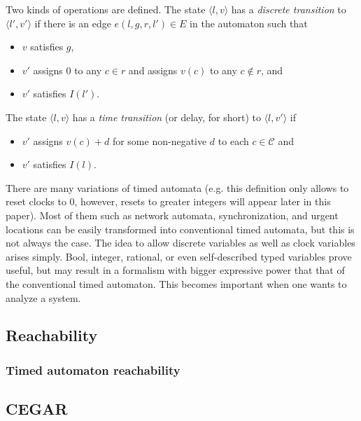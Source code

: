 Two kinds of operations are defined. The state $\langle l,v \rangle$ has a
\emph{discrete transition} to $\langle l',v' \rangle$  if there is an
edge $e(l,g,r,l') \in E$ in the automaton such that 
\begin{itemize}
	\item $v$ satisfies $g$, 
	\item $v'$ assigns 0 to any $c \in r$ and assigns $v(c)$ to any $c \not\in r$, and
	\item $v'$ satisfies $I(l')$. 
\end{itemize}
The state $\langle l,v \rangle$ has a \emph{time transition} (or delay, for short) to $\langle l,v' \rangle$ if
\begin{itemize}
	\item $v'$ assigns $v(c)+d$ for some non-negative $d$ to each $c \in \mathcal{C}$ and
	\item $v'$ satisfies $I(l)$. 
\end{itemize}


There are many variations of timed automata (e.g. this definition only allows to reset clocks to 0, however, resets to greater integers will appear later in this paper). Most of them such as network automata, synchronization, and urgent locations can be easily transformed into conventional timed automata, but this is not always the case. The idea to allow discrete variables as well as clock variables arises simply. Bool, integer, rational, or even self-described typed variables prove useful, but may result in a formalism with bigger expressive power that that of the conventional timed automaton. This becomes important when one wants to analyze a system.


\subsection{Reachability}


\subsubsection{Timed automaton reachability}



\subsection{CEGAR}
